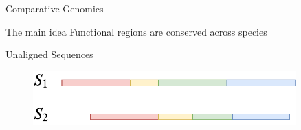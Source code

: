 \documentclass{beamer}
\begin{document}
    
        
    
    \begin{frame}{Comparative Genomics}
        \begin{block}{The main idea}
            Functional regions are conserved across species
        \end{block}
    \end{frame}
    
    \begin{frame}{Unaligned Sequences}
        \begin{figure}
            \centering
            \includegraphics[width=0.9\textwidth]{UnAligned.pdf}
            \label{fig:unaligned}
        \end{figure}
    \end{frame}
    
\end{document}
